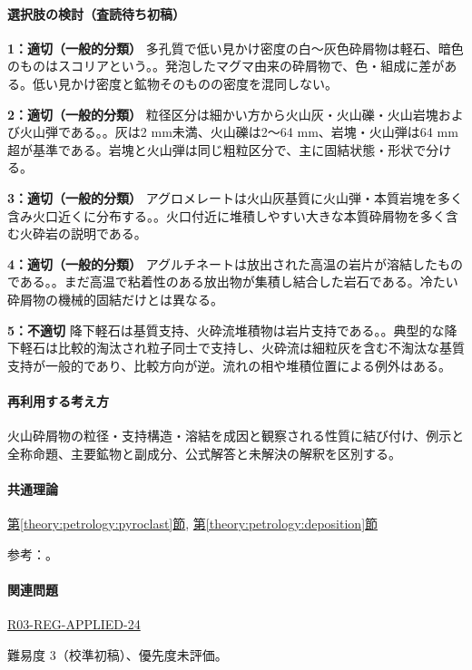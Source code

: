 \paragraph{選択肢の検討（査読待ち初稿）}\mbox{}\par

\noindent\textbf{1：適切（一般的分類）} 多孔質で低い見かけ密度の白〜灰色砕屑物は軽石、暗色のものはスコリアという。。発泡したマグマ由来の砕屑物で、色・組成に差がある。低い見かけ密度と鉱物そのものの密度を混同しない。\par

\noindent\textbf{2：適切（一般的分類）} 粒径区分は細かい方から火山灰・火山礫・火山岩塊および火山弾である。。灰は2 mm未満、火山礫は2〜64 mm、岩塊・火山弾は64 mm超が基準である。岩塊と火山弾は同じ粗粒区分で、主に固結状態・形状で分ける。\par

\noindent\textbf{3：適切（一般的分類）} アグロメレートは火山灰基質に火山弾・本質岩塊を多く含み火口近くに分布する。。火口付近に堆積しやすい大きな本質砕屑物を多く含む火砕岩の説明である。\par

\noindent\textbf{4：適切（一般的分類）} アグルチネートは放出された高温の岩片が溶結したものである。。まだ高温で粘着性のある放出物が集積し結合した岩石である。冷たい砕屑物の機械的固結だけとは異なる。\par

\noindent\textbf{5：不適切} 降下軽石は基質支持、火砕流堆積物は岩片支持である。。典型的な降下軽石は比較的淘汰され粒子同士で支持し、火砕流は細粒灰を含む不淘汰な基質支持が一般的であり、比較方向が逆。流れの相や堆積位置による例外はある。\par

\paragraph{再利用する考え方} 火山砕屑物の粒径・支持構造・溶結を成因と観察される性質に結び付け、例示と全称命題、主要鉱物と副成分、公式解答と未解決の解釈を区別する。

\paragraph{共通理論} \hyperref[theory:petrology:pyroclast]{第\ref*{theory:petrology:pyroclast}節}, \hyperref[theory:petrology:deposition]{第\ref*{theory:petrology:deposition}節}

\par 参考：\cite{usgs_tephra_sizes,usgs_pinatubo1996,usgs_ash_density,usgs_bishop_tuff}。

\paragraph{関連問題} \hyperref[q:r03-reg-applied-24]{R03-REG-APPLIED-24}

\par 難易度 3（校準初稿）、優先度未評価。
